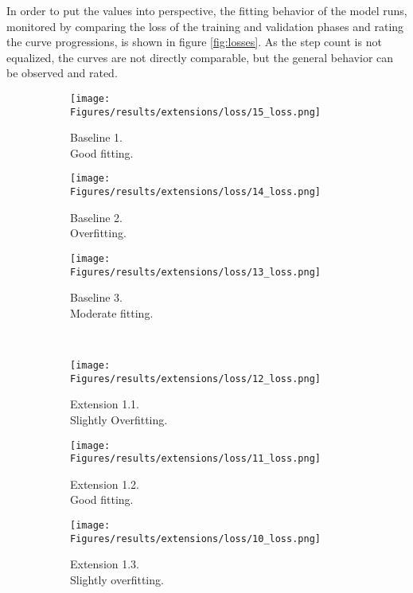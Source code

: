 In order to put the values into perspective, the fitting behavior of the model runs, monitored by comparing the loss of the training and validation phases and rating the curve progressions, is shown in figure \ref{fig:losses}. As the step count is not equalized, the curves are not directly comparable, but the general behavior can be observed and rated.

\begin{figure}[!hp]
    \centering
    \begin{subfigure}{.325\textwidth}
        \centering
        \texttt{[image: Figures/results/extensions/loss/15\_loss.png]}
        \caption{Baseline 1.\\Good fitting.}
    \end{subfigure}
    \begin{subfigure}{.325\textwidth}
        \centering
        \texttt{[image: Figures/results/extensions/loss/14\_loss.png]}
        \caption{Baseline 2.\\Overfitting.}
    \end{subfigure}
    \begin{subfigure}{.325\textwidth}
        \centering
        \texttt{[image: Figures/results/extensions/loss/13\_loss.png]}
        \caption{Baseline 3.\\Moderate fitting.}
    \end{subfigure}
    \\
    \begin{subfigure}{.325\textwidth}
        \centering
        \texttt{[image: Figures/results/extensions/loss/12\_loss.png]}
        \caption{Extension 1.1.\\Slightly Overfitting.}
    \end{subfigure}
    \begin{subfigure}{.325\textwidth}
        \centering
        \texttt{[image: Figures/results/extensions/loss/11\_loss.png]}
        \caption{Extension 1.2.\\Good fitting.}
    \end{subfigure}
    \begin{subfigure}{.325\textwidth}
        \centering
        \texttt{[image: Figures/results/extensions/loss/10\_loss.png]}
        \caption{Extension 1.3.\\Slightly overfitting.}
    \end{subfigure}
    \\
    \begin{subfigure}{.325\textwidth}

\end{subfigure}
\end{figure}
